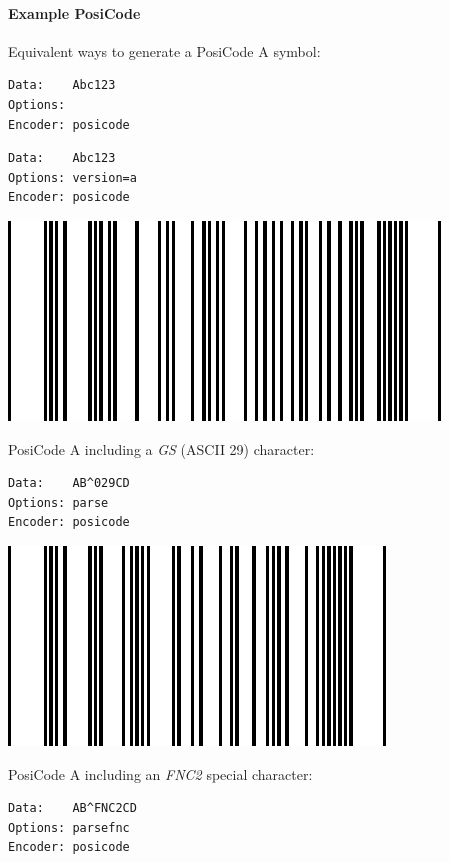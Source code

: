\hypertarget{example-posicode}{%
\paragraph{Example PosiCode}\label{example-posicode}}

Equivalent ways to generate a PosiCode A symbol:

\begin{verbatim}
Data:    Abc123
Options: 
Encoder: posicode
\end{verbatim}

\begin{verbatim}
Data:    Abc123
Options: version=a
Encoder: posicode
\end{verbatim}

\includegraphics{images/posicode-1.eps}

PosiCode A including a \emph{GS} (ASCII 29) character:

\begin{verbatim}
Data:    AB^029CD
Options: parse
Encoder: posicode
\end{verbatim}

\includegraphics{images/posicode-2.eps}

PosiCode A including an \emph{FNC2} special character:

\begin{verbatim}
Data:    AB^FNC2CD
Options: parsefnc
Encoder: posicode
\end{verbatim}

